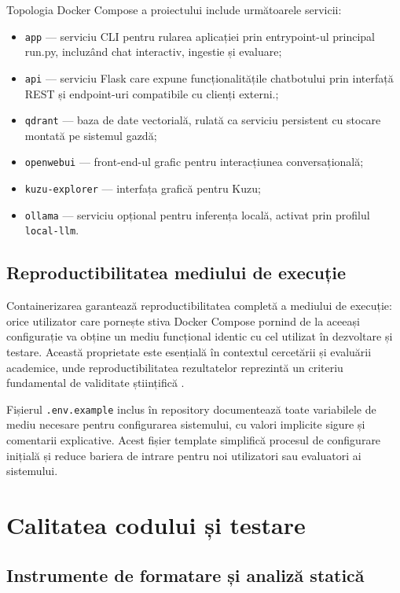 \documentclass[12pt, a4paper, oneside, romanian]{teza-upb}
\begin{document}
Topologia Docker Compose a proiectului include următoarele servicii:
\begin{itemize}
  \item \texttt{app} — serviciu CLI pentru rularea aplicației prin entrypoint-ul principal run.py,
  incluzând chat interactiv, ingestie și evaluare;
  \item \texttt{api} — serviciu Flask care expune funcționalitățile chatbotului prin interfață REST
  și endpoint-uri compatibile cu clienți externi.;
  \item \texttt{qdrant} — baza de date vectorială, rulată ca serviciu 
  persistent cu stocare montată pe sistemul gazdă;
  \item \texttt{openwebui} — front-end-ul grafic pentru interacțiunea 
  conversațională;
  \item \texttt{kuzu-explorer} — interfața grafică pentru Kuzu;
  \item \texttt{ollama} — serviciu opțional pentru inferența locală, 
  activat prin profilul \texttt{local-llm}.
\end{itemize}

\subsection{Reproductibilitatea mediului de execuție}

Containerizarea garantează reproductibilitatea completă a mediului de execuție: orice utilizator care pornește stiva Docker Compose pornind de la aceeași configurație va obține un mediu funcțional identic cu cel utilizat în dezvoltare și testare. Această proprietate este esențială în contextul cercetării și evaluării academice, unde reproductibilitatea rezultatelor reprezintă un criteriu fundamental de validitate științifică \cite{reproducibility2018}.

Fișierul \texttt{.env.example} inclus în repository documentează  toate variabilele de mediu necesare pentru configurarea sistemului, cu valori implicite sigure și comentarii explicative. Acest fișier template simplifică procesul de configurare inițială și reduce bariera de intrare pentru noi utilizatori sau evaluatori ai sistemului.

\section{Calitatea codului și testare}

\subsection{Instrumente de formatare și analiză statică}
\end{document}
